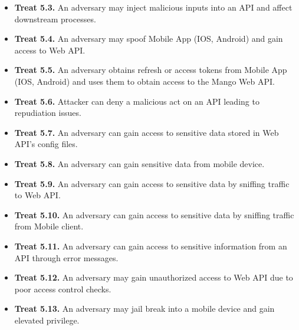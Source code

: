 \begin{enumerate}
\begin{itemize}
        \item \textbf{Treat 5.3.} An adversary may inject malicious inputs into an API and affect downstream processes.
        \item \textbf{Treat 5.4.} An adversary may spoof Mobile App (IOS, Android) and gain access to Web API\@.
        \item \textbf{Treat 5.5.} An adversary obtains refresh or access tokens from Mobile App (IOS, Android) and uses them to
        obtain access to the Mango Web API\@.
        \item \textbf{Treat 5.6.} Attacker can deny a malicious act on an API leading to repudiation issues.
        \item \textbf{Treat 5.7.} An adversary can gain access to sensitive data stored in Web API's config files.
        \item \textbf{Treat 5.8.} An adversary can gain sensitive data from mobile device.
        \item \textbf{Treat 5.9.} An adversary can gain access to sensitive data by sniffing traffic to Web API\@.
        \item \textbf{Treat 5.10.} An adversary can gain access to sensitive data by sniffing traffic from Mobile client.
        \item \textbf{Treat 5.11.} An adversary can gain access to sensitive information from an API through error messages.
        \item \textbf{Treat 5.12.} An adversary may gain unauthorized access to Web API due to poor access control checks.
        \item \textbf{Treat 5.13.} An adversary may jail break into a mobile device and gain elevated privilege.
    \end{itemize}
\end{enumerate}